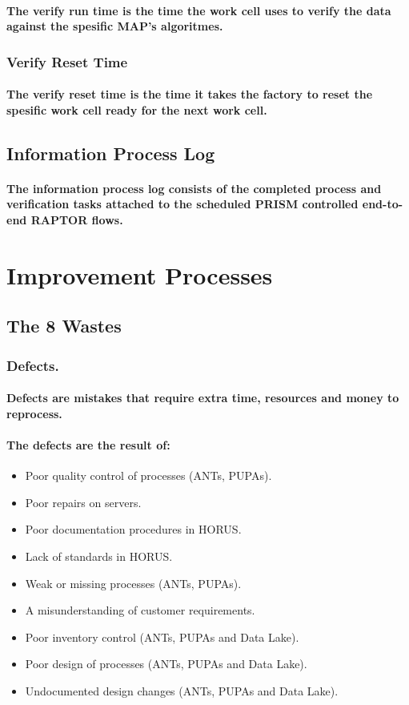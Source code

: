 \paragraph{The verify run time is the time the work cell uses to verify the data against the spesific MAP's algoritmes.}
\subsubsection{Verify Reset Time}
\paragraph{The verify reset time is the time it takes the factory to reset the spesific work cell ready for the next work cell.}
\subsection{Information Process Log}
\paragraph{The information process log consists of the completed process and verification tasks attached to the scheduled PRISM controlled end-to-end RAPTOR flows.}
\pagebreak
\section{Improvement Processes}
\subsection{The 8 Wastes}
\subsubsection{Defects.}
\paragraph{Defects are mistakes that require extra time, resources and money to reprocess.}
\paragraph{The defects are the result of:}
\begin{itemize}
\item Poor quality control of processes (ANTs, PUPAs).
\item Poor repairs on servers.
\item Poor documentation procedures in HORUS.
\item Lack of standards in HORUS.
\item Weak or missing processes (ANTs, PUPAs).
\item A misunderstanding of customer requirements.
\item Poor inventory control (ANTs, PUPAs and Data Lake).
\item Poor design of processes (ANTs, PUPAs and Data Lake).
\item Undocumented design changes (ANTs, PUPAs and Data Lake).
\end{itemize}
